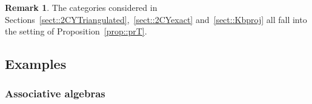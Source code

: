 \documentclass{amsart}
\newtheorem{corollary}[theorem]{Corollary}
\theoremstyle{definition}
\newtheorem{remark}[theorem]{Remark}
\begin{document}
\begin{remark}
 The categories considered in Sections~\ref{sect::2CYTriangulated},~\ref{sect::2CYexact} and~\ref{sect::Kbproj} all fall into the setting of Proposition~\ref{prop::prT}.
\end{remark}



\subsection{Examples}

\subsubsection{Associative algebras}
\end{document}
